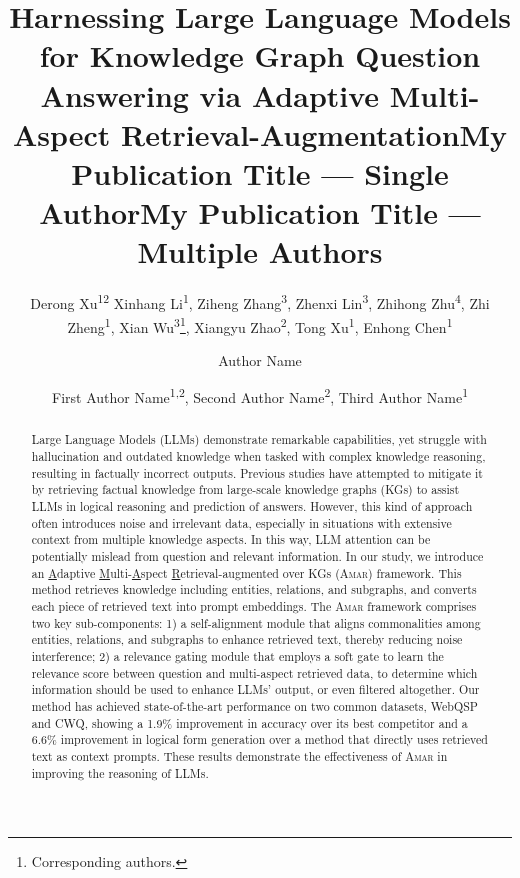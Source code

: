 \documentclass[letterpaper]{article} %
\title{Harnessing Large Language Models for Knowledge Graph Question Answering
via Adaptive Multi-Aspect Retrieval-Augmentation}
\author{
    Derong Xu\textsuperscript{\rm 12} Xinhang Li\textsuperscript{\rm 1}, Ziheng Zhang\textsuperscript{\rm 3}, Zhenxi Lin\textsuperscript{\rm 3}, Zhihong Zhu\textsuperscript{\rm 4}, Zhi Zheng\textsuperscript{\rm 1}, Xian Wu\textsuperscript{\rm 3}\thanks{Corresponding authors.}, Xiangyu Zhao\textsuperscript{\rm 2}\footnotemark[1], Tong Xu\textsuperscript{\rm 1}\footnotemark[1], Enhong Chen\textsuperscript{\rm 1}
}
\title{My Publication Title --- Single Author}
\author {
    Author Name
}
\title{My Publication Title --- Multiple Authors}
\author {
    First Author Name\textsuperscript{\rm 1,\rm 2},
    Second Author Name\textsuperscript{\rm 2},
    Third Author Name\textsuperscript{\rm 1}
}
\begin{document}
\maketitle

\begin{abstract}
Large Language Models (LLMs) demonstrate remarkable capabilities, yet struggle with hallucination and outdated knowledge when tasked with complex knowledge reasoning, resulting in factually incorrect outputs. Previous studies have attempted to mitigate it by retrieving factual knowledge from large-scale knowledge graphs (KGs) to assist LLMs in logical reasoning and prediction of answers. However, this kind of approach often introduces noise and irrelevant data, especially in situations with extensive context from multiple knowledge aspects. In this way, LLM attention can be potentially mislead from question and relevant information. In our study, we introduce an \underline{A}daptive \underline{M}ulti-\underline{A}spect \underline{R}etrieval-augmented over KGs (\textsc{Amar}) framework. This method retrieves knowledge including entities, relations, and subgraphs, and converts each piece of retrieved text into prompt embeddings. The \textsc{Amar} framework comprises two key sub-components: 1) a self-alignment module that aligns commonalities among entities, relations, and subgraphs to enhance retrieved text, thereby reducing noise interference; 2) a relevance gating module that employs a soft gate to learn the relevance score between question and multi-aspect retrieved data, to determine which information should be used to enhance LLMs' output, or even filtered altogether. Our method has achieved state-of-the-art performance on two common datasets, WebQSP and CWQ, showing a 1.9\% improvement in accuracy over its best competitor and a 6.6\% improvement in logical form generation over a method that directly uses retrieved text as context prompts. These results demonstrate the effectiveness of \textsc{Amar} in improving the reasoning of LLMs.
\begin{links}
\end{links}

\end{abstract}







% 


\end{document}

